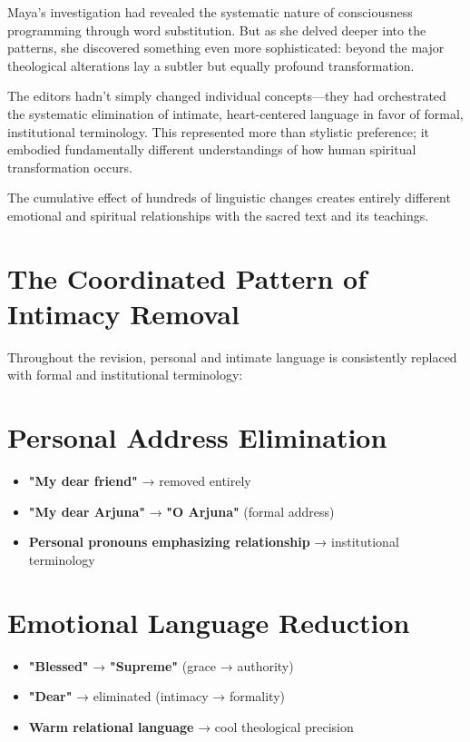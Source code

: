 \documentclass[11pt,twoside]{book}
\begin{document}
\normalfont\justifying
Maya's investigation had revealed the systematic nature of consciousness programming through word substitution. But as she delved deeper into the patterns, she discovered something even more sophisticated: beyond the major theological alterations lay a subtler but equally profound transformation.

The editors hadn't simply changed individual concepts—they had orchestrated the systematic elimination of intimate, heart-centered language in favor of formal, institutional terminology. This represented more than stylistic preference; it embodied fundamentally different understandings of how human spiritual transformation occurs.

The cumulative effect of hundreds of linguistic changes creates entirely different emotional and spiritual relationships with the sacred text and its teachings.
\section*{The Coordinated Pattern of Intimacy Removal}
\label{sec:orgff8b4c3}

Throughout the revision, personal and intimate language is consistently replaced with formal and institutional terminology:
\section*{Personal Address Elimination}
\label{sec:org6314bad}
\begin{itemize}
\item \textbf{\textbf{"My dear friend"}} → removed entirely
\item \textbf{\textbf{"My dear Arjuna"}} → \textbf{\textbf{"O Arjuna"}} (formal address)
\item \textbf{\textbf{Personal pronouns emphasizing relationship}} → institutional terminology
\end{itemize}
\section*{Emotional Language Reduction}
\label{sec:orgc93bf9c}
\begin{itemize}
\item \textbf{\textbf{"Blessed"}} → \textbf{\textbf{"Supreme"}} (grace → authority)
\item \textbf{\textbf{"Dear"}} → eliminated (intimacy → formality)
\item \textbf{\textbf{Warm relational language}} → cool theological precision
\end{itemize}
\end{document}
